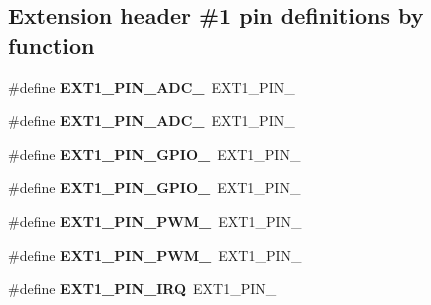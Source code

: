 \subsection*{Extension header \#1 pin definitions by function}
\begin{DoxyCompactItemize}
\item 
\hypertarget{group__saml21__xplained__pro__features__group_ga5cb1dd78b8ab2337a600ac1fb5952f98}{}\#define {\bfseries E\+X\+T1\+\_\+\+P\+I\+N\+\_\+\+A\+D\+C\+\_}~E\+X\+T1\+\_\+\+P\+I\+N\+\_\label{group__saml21__xplained__pro__features__group_ga5cb1dd78b8ab2337a600ac1fb5952f98}

\item 
\hypertarget{group__saml21__xplained__pro__features__group_gab5927d53d39f07615e31de423b5cd2f8}{}\#define {\bfseries E\+X\+T1\+\_\+\+P\+I\+N\+\_\+\+A\+D\+C\+\_}~E\+X\+T1\+\_\+\+P\+I\+N\+\_\label{group__saml21__xplained__pro__features__group_gab5927d53d39f07615e31de423b5cd2f8}

\item 
\hypertarget{group__saml21__xplained__pro__features__group_gafbdd5cd8e6664c704b7e1d62a50bb9fc}{}\#define {\bfseries E\+X\+T1\+\_\+\+P\+I\+N\+\_\+\+G\+P\+I\+O\+\_}~E\+X\+T1\+\_\+\+P\+I\+N\+\_\label{group__saml21__xplained__pro__features__group_gafbdd5cd8e6664c704b7e1d62a50bb9fc}

\item 
\hypertarget{group__saml21__xplained__pro__features__group_ga694376ccdf6ec8fb0101121fe0dd2bd6}{}\#define {\bfseries E\+X\+T1\+\_\+\+P\+I\+N\+\_\+\+G\+P\+I\+O\+\_}~E\+X\+T1\+\_\+\+P\+I\+N\+\_\label{group__saml21__xplained__pro__features__group_ga694376ccdf6ec8fb0101121fe0dd2bd6}

\item 
\hypertarget{group__saml21__xplained__pro__features__group_ga5c60de0dd8e1c11f58a368792e8ab86e}{}\#define {\bfseries E\+X\+T1\+\_\+\+P\+I\+N\+\_\+\+P\+W\+M\+\_}~E\+X\+T1\+\_\+\+P\+I\+N\+\_\label{group__saml21__xplained__pro__features__group_ga5c60de0dd8e1c11f58a368792e8ab86e}

\item 
\hypertarget{group__saml21__xplained__pro__features__group_gac96b2c63e08f74698ce613d73a54bc3b}{}\#define {\bfseries E\+X\+T1\+\_\+\+P\+I\+N\+\_\+\+P\+W\+M\+\_}~E\+X\+T1\+\_\+\+P\+I\+N\+\_\label{group__saml21__xplained__pro__features__group_gac96b2c63e08f74698ce613d73a54bc3b}

\item 
\hypertarget{group__saml21__xplained__pro__features__group_ga3ebd8ed9b501a9b88623b0a084ec098b}{}\#define {\bfseries E\+X\+T1\+\_\+\+P\+I\+N\+\_\+\+I\+R\+Q}~E\+X\+T1\+\_\+\+P\+I\+N\+\_\label{group__saml21__xplained__pro__features__group_ga3ebd8ed9b501a9b88623b0a084ec098b}


\end{DoxyCompactItemize}
